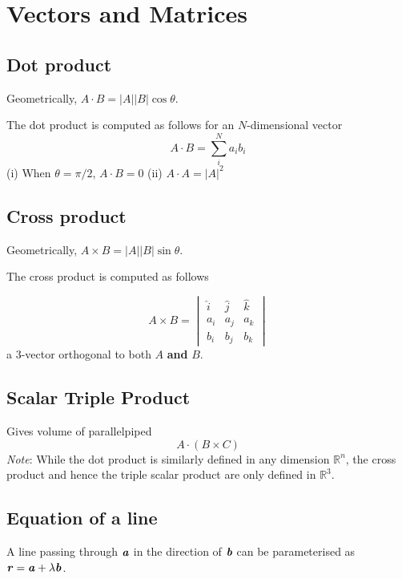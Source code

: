 
\section{Vectors and Matrices}

\subsection*{Dot product}

Geometrically, $A \cdot B = |A| |B| \cos \theta$.

The dot product is computed as follows for an $N$-dimensional vector
\begin{equation*}
  A \cdot B = \sum_{i}^{N} a_i b_i
\end{equation*}
(i) When $\theta = \pi / 2$, $A \cdot B = 0$ (ii) $A \cdot A = |A|^2$

\subsection*{Cross product}

Geometrically, $A \times B = |A| |B| \sin \theta$.

The cross product is computed as follows

\begin{equation*}
  A \times B = \begin{vmatrix} \hat{i} & \hat{j} & \hat{k} \\ a_i & a_j & a_k \\ b_i  & b_j & b_k\end{vmatrix}
\end{equation*}
a 3-vector orthogonal to both $A$ \textbf{and} $B$.

\subsection*{Scalar Triple Product}
Gives volume of parallelpiped
\begin{equation*}
  A \cdot (B \times C)
\end{equation*}
\textit{Note}: While the dot product is similarly defined in any dimension $\mathbb{R}^n$, the cross product and hence
the triple scalar product are only defined in $\mathbb{R}^3$.

\subsection*{Equation of a line}
A line passing through $\textbf{\textit{a}}$ in the direction of $\textbf{\textit{b}}$ can be parameterised as
$\textbf{\textit{r}} = \textbf{\textit{a}} + \lambda \textbf{\textit{b}}$.
